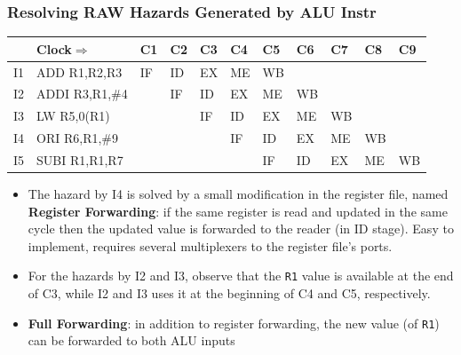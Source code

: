 \documentclass{beamer}
\renewcommand{\emph}[1]{\textcolor{structure}{#1}}
\newcommand{\emp}[1]{\textcolor{DikuRed}{ #1}}
\begin{document}
\begin{frame}[fragile,t]
\frametitle{Resolving RAW Hazards Generated by ALU Instr}

\bigskip

\begin{scriptsize}
\begin{tabular}{lllllllllll}
\hline
   & Clock$\Rightarrow$ & C1 & C2 & C3 & C4 & C5 & C6 & C7 & C8 & C9 \\\hline
I1 & ADD  R1,R2,R3      & IF & ID & EX & \emp{ME} & WB &    &    &    &    \\
I2 & ADDI R3,R1,\#4     &    & IF & ID & \emph{EX} & ME & WB &    &    &    \\
I3 & LW   R5,0(R1)      &    &    & IF & ID & \emph{EX} & ME & WB &    &    \\
I4 & ORI  R6,R1,\#9     &    &    &    & IF & ID & \emph{EX} & ME & WB &    \\
I5 & SUBI R1,R1,R7      &    &    &    &    & IF & ID & EX & ME & WB \\\hline
\end{tabular}
\end{scriptsize} 

\bigskip

\begin{scriptsize}
\begin{itemize}
\item The hazard by I4 is solved by a small modification in the 
        \emp{register file}, named\\
        \emph{\bf Register Forwarding}: if the same register is read and 
        updated in the same cycle then the updated value is forwarded to the
        reader (in ID stage). Easy to implement, requires several multiplexers 
        to the register file's ports.\smallskip
        
\item For the hazards by I2 and I3, observe that the {\tt R1} value
        is available at the end of C3, while I2 and I3 uses it at the
        beginning of C4 and C5, respectively.\smallskip

\item \emph{\bf Full Forwarding}: in addition to register forwarding, 
        the new value (of {\tt R1}) can be \emph{forwarded to both ALU inputs}
\begin{itemize}
\end{itemize}
\end{itemize}
\end{scriptsize}

\end{frame}
\end{document}
